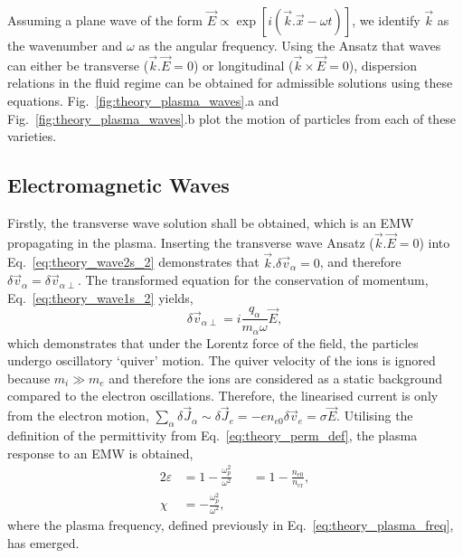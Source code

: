 Assuming a plane wave of the form $\vec{E}\propto \exp{\left[ i\left( \vec{k}.\vec{x} - \omega t \right) \right]}$, we identify $\vec{k}$ as the wavenumber and $\omega$ as the angular frequency.
Using the Ansatz that waves can either be transverse ($\vec{k}.\vec{E}=0$) or longitudinal ($\vec{k}\times\vec{E}=0$), dispersion relations in the fluid regime can be obtained for admissible solutions using these equations.
Fig.~\ref{fig:theory_plasma_waves}.a and Fig.~\ref{fig:theory_plasma_waves}.b plot the motion of particles from each of these varieties.

\subsection{Electromagnetic Waves}%
\label{sec:theory_transwaves}

Firstly, the transverse wave solution shall be obtained, which is an \ac{EMW} propagating in the plasma.
Inserting the transverse wave Ansatz ($\vec{k}.\vec{E}=0$) into Eq.~\ref{eq:theory_wave2s_2} demonstrates that $\vec{k}.\delta\vec{v}_\alpha=0$, and therefore $\delta\vec{v}_\alpha = \delta\vec{v}_{\alpha\perp}$.
The transformed equation for the conservation of momentum, Eq.~\ref{eq:theory_wave1s_2} yields,
\begin{equation}
    \label{eq:theory_EMW_quiver}
    \delta\vec{v}_{\alpha\perp} = i \frac{q_\alpha}{m_\alpha \omega}\vec{E},
\end{equation}
which demonstrates that under the Lorentz force of the field, the particles undergo oscillatory `quiver' motion.
The quiver velocity of the ions is ignored because $m_i \gg m_e$ and therefore the ions are considered as a static background compared to the electron oscillations.
Therefore, the linearised current is only from the electron motion, $\sum\nolimits_\alpha\delta\vec{J}_\alpha\sim\delta\vec{J}_e = -e n_{e0}\delta \vec{v}_e = \sigma \vec{E}$.
Utilising the definition of the permittivity from Eq.~\ref{eq:theory_perm_def}, the plasma response to an \ac{EMW} is obtained,
\begin{alignat}{2}
    \label{eq:theory_emw_epsilon}
    \varepsilon &= 1 - \frac{\omega_p^2}{\omega^2} &&= 1- \frac{n_{e0}}{n_{\text{cr}}},\\
    \chi &= - \frac{\omega_p^2}{\omega^2}, &&
\end{alignat}
where the plasma frequency, defined previously in Eq.~\ref{eq:theory_plasma_freq}, has emerged.

